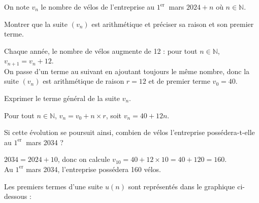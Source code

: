 \documentclass[11pt,a4paper]{article}  %
\begin{document}
On note $v_n$ le nombre de vélos de l'entreprise au $1^{\text {er }}$ mars $2024+n$ où $n \in \mathbb{N}$.
\begin{enumMet}
	\item Montrer que la suite $\left(v_n\right)$ est arithmétique et préciser sa raison et son premier terme.
	\par
	\begin{corrBox}
		Chaque année, le nombre de vélos augmente de 12 : pour tout $n\in\mathbb{N}$, $v_{n+1}=v_n+12$.\\
		On passe d'un terme au suivant en ajoutant toujours le même nombre, donc la suite $\left(v_n\right)$ est arithmétique de raison $r=12$ et de premier terme $v_0=40$.
	\end{corrBox}

	\item Exprimer le terme général de la suite $v_n$.
	\par
	\begin{corrBox}
		Pour tout $n\in\mathbb{N}$, $v_n=v_0+n\times r$, soit $v_n=40+12n$.
	\end{corrBox}

	\item Si cette évolution se poursuit ainsi, combien de vélos l'entreprise possédera-t-elle au $1^{\text {er }}$ mars 2034 ?
	\par
	\begin{corrBox}
		$2034=2024+10$, donc on calcule $v_{10}=40+12\times 10=40+120=160$.\\
		Au $1^{\text{er}}$ mars 2034, l'entreprise possédera 160 vélos.
	\end{corrBox}
\end{enumMet}


\exerciceDS{}
Les premiers termes d'une suite $u(n)$ sont représentés dans le graphique ci-dessous :

\begin{center}
\end{center}
\end{document}
